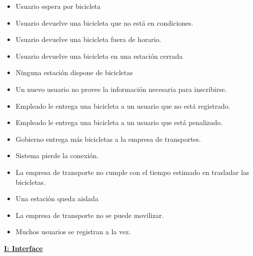 \begin{itemize}
\item Usuario espera por bicicleta
\item Usuario devuelve una bicicleta que no está en condiciones.
\item Usuario devuelve una bicicleta fuera de horario.
\item Usuario devuelve una bicicleta en una estación cerrada
\item Ninguna estación dispone de bicicletas
\item Un nuevo usuario no provee la información necesaria para inscribirse.
\item Empleado le entrega una bicicleta a un usuario que no está registrado.
\item Empleado le entrega una bicicleta a un usuario que está penalizado.
\item Gobierno entrega más bicicletas a la empresa de transportes.
\item Sistema pierde la conexión.
\item La empresa de transporte no cumple con el tiempo estimado en trasladar las bicicletas.
\item Una estación queda aislada
\item La empresa de transporte no se puede movilizar.
\item Muchos usuarios se registran a la vez.
\end{itemize}

\vspace{1cm}
\textbf{\underline{I: Interface}}

